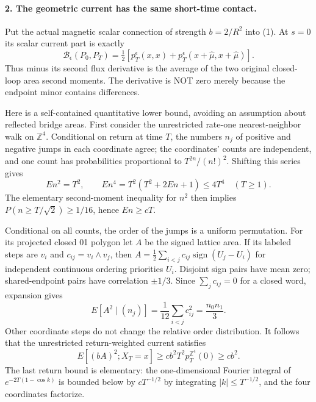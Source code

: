 \documentclass[11pt]{article}
\begin{document}
\paragraph{2. The geometric current has the same short-time contact.}
Put the actual magnetic scalar connection of strength $b=2/R^2$ into (1).
At $s=0$ its scalar current part is exactly
\[
 \mathcal B_\epsilon(P_0,P_T)
       =\tfrac12[p_T^\epsilon(x,x)+p_T^\epsilon(x+\hat\mu,x+\hat\mu)].
                                                                    \tag{3}
\]
Thus minus its second flux derivative is the average of the two original
closed-loop area second moments. The derivative is NOT zero merely
because the endpoint minor contains differences.

Here is a self-contained quantitative lower bound, avoiding an assumption
about reflected bridge areas. First consider the unrestricted rate-one
nearest-neighbor walk on $\mathbb Z^4$. Conditional on return at time $T$,
the numbers $n_j$ of positive and negative jumps in each coordinate agree;
the coordinates' counts are independent, and one count has probabilities
proportional to $T^{2n}/(n!)^2$. Shifting this series gives
\[
 E n^2=T^2,\qquad E n^4=T^2(T^2+2En+1)\le4T^4\quad(T\ge1).
\]
The elementary second-moment inequality for $n^2$ then implies
$P(n\ge T/\sqrt2)\ge1/16$, hence $En\ge cT$.

Conditional on all counts, the order of the jumps is a uniform
permutation. For its projected closed 01 polygon let $A$ be the signed
lattice area. If its labeled steps are $v_i$ and
$c_{ij}=v_i\wedge v_j$, then
$A=\frac12\sum_{i<j}c_{ij}\operatorname{sign}(U_j-U_i)$ for independent
continuous ordering priorities $U_i$. Disjoint sign pairs have mean zero;
shared-endpoint pairs have correlation $\pm1/3$.
Since $\sum_jc_{ij}=0$ for a closed word, expansion gives
\[
 E[A^2\mid(n_j)]=\frac1{12}\sum_{i<j}c_{ij}^2
                         =\frac{n_0n_1}{3}.                     \tag{4}
\]
Other coordinate steps do not change the relative order distribution.
It follows that the unrestricted return-weighted current satisfies
\[
 E[(bA)^2;X_T=x]\ge cb^2 T^2 p_T^{\mathbb Z^4}(0)\ge cb^2.
                                                                    \tag{5}
\]
The last return bound is elementary: the one-dimensional Fourier integral
of $e^{-2T(1-\cos k)}$ is bounded below by $cT^{-1/2}$ by integrating
$|k|\le T^{-1/2}$, and the four coordinates factorize.
\end{document}
